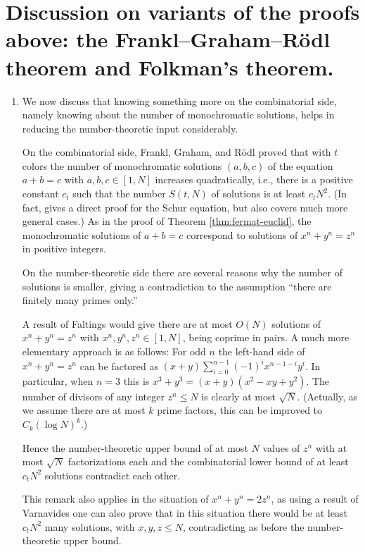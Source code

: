 \documentclass[12pt]{article}
\theoremstyle{theorem}
\theoremstyle{definition}
\begin{document}
\section{Discussion on variants of the proofs above:
  the Frankl--Graham--R\"{o}dl theorem and
  Folkman's theorem.}
{\label{sec:discussion}}
\begin{enumerate}
\item 
We now discuss that knowing something more on the combinatorial side,
namely knowing about the number of monochromatic 
solutions, helps in reducing the number-theoretic input considerably.

On the combinatorial side, 
Frankl, Graham, and R\"odl \cite{Frankl-Graham-Rodl:1988} proved 
that with $t$ colors the number of monochromatic solutions 
$(a,b,c)$ of the equation $a+b=c$  with $a,b,c \in [1,N]$ increases
quadratically, i.e., there is a positive constant 
$c_t$ such that the number $S(t,N)$ of solutions is at least $c_t N^2$.
(In fact, \cite{Frankl-Graham-Rodl:1988}
gives a direct proof for the Schur equation, 
but also covers much more general cases.)
As in the proof of Theorem \ref{thm:fermat-euclid},
the monochromatic solutions of $a+b=c$
correspond to solutions of $x^n+y^n=z^n$ in positive integers.

On the number-theoretic side there are several reasons why the number of
solutions is smaller, giving a contradiction to the assumption ``there are 
finitely many primes only.''

A result of Faltings \cite{Faltings:1983} would give there are at most $O(N)$ 
solutions of $x^n+y^n=z^n$ with $x^n,y^n,z^n\in [1,N]$, being coprime in pairs.
A much more elementary approach is as follows:
For odd $n$ the left-hand side of $x^n+y^n=z^n$ can be factored as 
$(x+y)\sum_{i=0}^{n-1}(-1)^ix^{n-1-i}y^i$. In particular, when
$n=3$ this is $x^3+y^3=(x+y)(x^2-xy+y^2)$.
The number of divisors of any
integer $z^n \leq N$ is clearly at most $\sqrt{N}$. (Actually, as we assume
there are at most $k$ prime factors, this can be improved to $C_k (\log N)^k$.)

Hence the number-theoretic upper bound of at most $N$ values of $z^n$ 
with at most $\sqrt{N}$ factorizations each
and the combinatorial lower bound of at least $c_t N^2$ solutions
contradict each other.


This remark also applies in the situation of $x^n+y^n=2z^n$, as using a
result of Varnavides \cite{Varnavides:1959} one can also
prove that in this situation there would be at least $c_t N^2$ 
many solutions, with $x,y,z\leq N$, contradicting as before the 
number-theoretic upper bound.


\end{enumerate}
\end{document}

